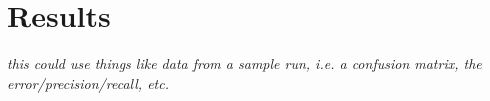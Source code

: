 \documentclass[twoside,11pt]{article}
\begin{document}
\section{Results}

\emph{this could use things like data from a sample run, i.e. a confusion matrix, the error/precision/recall, etc.}





\newpage





\vskip 0.2in

\end{document}
